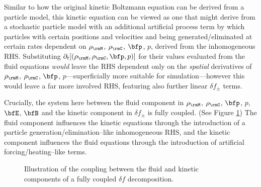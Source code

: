         Similar to how the original kinetic Boltzmann equation can be derived from a particle model, this kinetic equation can be viewed as one that might derive from a stochastic particle model with an additional artificial process term by which particles with certain positions and velocities and being generated/eliminated at certain rates dependent on $\rho_{\rmM}$, $\rho_{\rmC}$, $\bfp$, $p$, derived from the inhomogeneous RHS. Substituting $\partial_{t}[(\rho_{\rmM}, \rho_{\rmC}, \bfp, p)]$ for their values evaluated from the fluid equations \emph{would} leave the RHS dependent only on the \emph{spatial} derivatives of $\rho_{\rmM}$, $\rho_{\rmC}$, $\bfp$, $p$---superficially more suitable for simulation---however this would leave a far more involved RHS, featuring also further linear $\delta\!f_{\pm}$ terms.

    \line

    Crucially, the system here between the fluid component in $\rho_{\rmM}$, $\rho_{\rmC}$, $\bfp$, $p$, $\bfE$, $\bfB$ and the kinetic component in $\delta\!f_{\pm}$ is fully coupled. (See Figure \ref{fig:delta f coupling}) The fluid component influences the kinetic equations through the introduction of a particle generation/elimination--like inhomogeneous RHS, and the kinetic component influences the fluid equations through the introduction of artificial forcing/heating--like terms.

    \begin{figure}[!ht]
        \centering
        \caption{Illustration of the coupling between the fluid and kinetic components of a fully coupled $\delta\!f$ decomposition.}
        \label{fig:delta f coupling}
    \end{figure}
    
